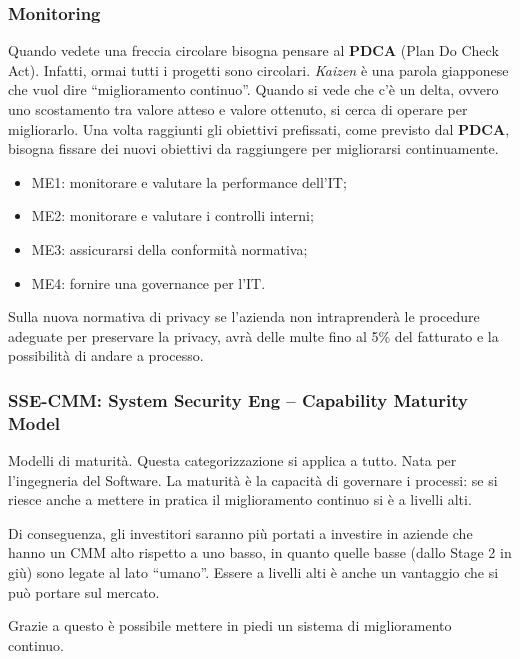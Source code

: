 \subsubsection{Monitoring}
Quando vedete una freccia circolare bisogna pensare al \textbf{PDCA} (Plan Do 
Check Act). Infatti, ormai tutti i progetti sono circolari. \emph{Kaizen} è 
una parola giapponese che vuol dire “miglioramento continuo”. Quando si vede 
che c’è un delta, ovvero uno scostamento tra valore atteso e valore ottenuto, 
si cerca di operare per migliorarlo. Una volta raggiunti gli obiettivi 
prefissati, come previsto dal \textbf{PDCA}, bisogna fissare dei nuovi 
obiettivi da raggiungere per migliorarsi continuamente.

\begin{itemize}
\item ME1: monitorare e valutare la performance dell'IT;
\item ME2: monitorare e valutare i controlli interni;
\item ME3: assicurarsi della conformità normativa;
\item ME4: fornire una governance per l'IT.
\end{itemize}

Sulla nuova normativa di privacy se l'azienda non intraprenderà le procedure 
adeguate per preservare la privacy, avrà delle multe fino al 5\% del fatturato 
e la possibilità di andare a processo.

\subsubsection{SSE-CMM: System Security Eng -- Capability Maturity Model}

Modelli di maturità. Questa categorizzazione si applica a tutto. Nata per 
l'ingegneria del Software.
La maturità è la capacità di governare i processi: se si riesce anche a 
mettere in pratica il miglioramento continuo si è a livelli alti.

Di conseguenza, gli investitori saranno più portati a investire in aziende che 
hanno un CMM alto rispetto a uno basso, in quanto quelle basse (dallo Stage 2 
in giù) sono legate al lato ``umano''. Essere a livelli alti è anche un 
vantaggio che si può portare sul mercato.

Grazie a questo è possibile mettere in piedi un sistema di miglioramento 
continuo.

